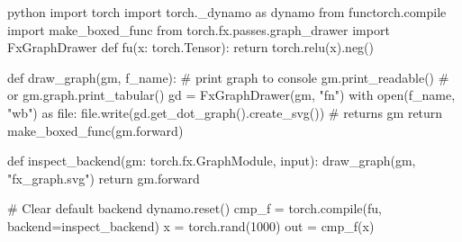 \begin{examplebox}\nospacing
    \begin{example}\label{example:graph_visualization}\leavevmode
        \begin{plaincodebox}{python}
            import torch
            import torch._dynamo as dynamo
            from functorch.compile import make_boxed_func
            from torch.fx.passes.graph_drawer import FxGraphDrawer
            def fu(x: torch.Tensor):
                return torch.relu(x).neg()

            def draw_graph(gm, f_name):
                # print graph to console
                gm.print_readable()  # or gm.graph.print_tabular()
                gd = FxGraphDrawer(gm, "fn")
                with open(f_name, "wb") as file:
                    file.write(gd.get_dot_graph().create_svg())
                    # returns gm
                    return make_boxed_func(gm.forward)

            def inspect_backend(gm: torch.fx.GraphModule, input):
                draw_graph(gm, "fx_graph.svg")
                return gm.forward

            # Clear default backend
            dynamo.reset()
            cmp_f = torch.compile(fu, backend=inspect_backend)
            x = torch.rand(1000)
            out = cmp_f(x)
        \end{plaincodebox}
    \end{example}
\end{examplebox}

